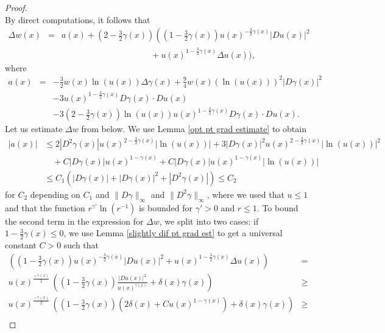 \documentclass[reqno,11pt]{amsart}
\newcommand{\1}{\mathds{1}}
\numberwithin{equation}{section}
\begin{document}
\begin{proof}
\begin{equation}
\end{equation}
By direct computations, it follows that
\begin{eqnarray*}
\Delta w(x) & = & a(x) + \left(2-\frac{3}{2}\gamma(x)\right) \left( \left(1-\frac{3}{2}\gamma(x)\right)u(x)^{-\frac{3}{2}\gamma(x)}|Du(x)|^2 \right.\\
& & \qquad \qquad \qquad \qquad \qquad \ \  + u(x)^{1-\frac{3}{2}\gamma(x)}\Delta u(x) \bigg),
\end{eqnarray*}
where
\begin{eqnarray*}
        a(x) & = & \displaystyle -\frac{3}{2}w(x)\ln(u(x))\Delta \gamma(x) + \frac{9}{4}w(x)(\ln(u(x)))^2|D\gamma(x)|^2\\
         &  & -\displaystyle  3u(x)^{1-\frac{3}{2}\gamma(x)} D\gamma(x)\cdot Du(x)\\
         &  & -\displaystyle 3\left(2-\frac{3}{2}\gamma(x)\right)\ln(u(x))u(x)^{1-\frac{3}{2}\gamma(x)} D\gamma(x) \cdot Du(x).
\end{eqnarray*}
Let us estimate $\Delta w$ from below. We use Lemma \ref{opt pt grad estimate} to obtain
\begin{align*}
	|a(x)| & \leq  2|D^2\gamma(x)|u(x)^{2-\frac{3}{2}\gamma(x)}|\ln(u(x))| + 3|D\gamma(x)|^2u(x)^{2-\frac{3}{2}\gamma(x)}|\ln(u(x))|^2\\
	&  \quad + C|D\gamma(x)|u(x)^{1-\gamma(x)} + C|D\gamma(x)|u(x)^{1-\gamma(x)}|\ln(u(x))|\\
	& \leq  C_1\left(|D\gamma(x)| + |D\gamma(x)|^2 +|D^2\gamma(x)|\right) \leq C_2
\end{align*}
for $C_2$ depending on $C_1$ and $\|D\gamma\|_\infty$ and $\|D^2 \gamma\|_\infty$, where we used that $u \leq 1$ and that the function $r^{\gamma'} \ln(r^{-1})$ is bounded for $\gamma' > 0$ and $r \leq 1$. To bound the second term in the expression for $\Delta w$, we split into two cases: if $1-\frac{3}{2}\gamma(x) \leq 0$, we use Lemma \ref{slightly dif pt grad est} to get a universal constant $C>0$ such that
\begin{eqnarray*}
    \displaystyle \left(\left(1-\frac{3}{2}\gamma(x)\right)u(x)^{-\frac{3}{2}\gamma(x)}|Du(x)|^2 + u(x)^{1-\frac{3}{2}\gamma(x)}\Delta u(x) \right) & = &   \\ 
     \displaystyle u(x)^{\frac{-\gamma(x)}{2}}\,\left(\left(1-\frac{3}{2}\gamma(x)\right)\frac{|Du(x)|^2}{u(x)^{\gamma(x)}} + \delta(x) \gamma(x)  \right) & \geq &\\
     \displaystyle u(x)^{\frac{-\gamma(x)}{2}}\,\left(\left(1-\frac{3}{2}\gamma(x)\right) \left(2\delta(x) + Cu(x)^{1-\gamma(x)}\right) + \delta(x) \gamma(x)  \right)& \geq & \\

\end{eqnarray*}
\end{proof}
\end{document}
